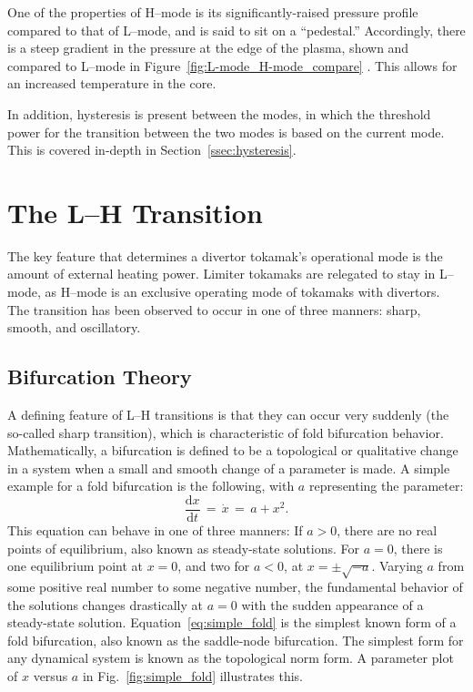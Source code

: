 One of the properties of H--mode is its significantly-raised pressure profile compared to that of L--mode, and is said to sit on a ``pedestal.''
Accordingly, there is a steep gradient in the pressure at the edge of the plasma, shown and compared to L--mode in Figure~\ref{fig:L-mode_H-mode_compare} \cite{weymiens_bifurcation_2014}.
This allows for an increased temperature in the core.

In addition, hysteresis is present between the modes, in which the threshold power for the transition between the two modes is based on the current mode.
This is covered in-depth in Section~\ref{ssec:hysteresis}.

\section{The L--H Transition}\label{sec:the_transition}
The key feature that determines a divertor tokamak's operational mode is the amount of external heating power.
Limiter tokamaks are relegated to stay in L--mode, as H--mode is an exclusive operating mode of tokamaks with divertors.
The transition has been observed to occur in one of three manners: sharp, smooth, and oscillatory.

\subsection{Bifurcation Theory}\label{ssec:bif_theory}
A defining feature of L--H transitions is that they can occur very suddenly (the so-called sharp transition), which is characteristic of fold bifurcation behavior.
Mathematically, a bifurcation is defined to be a topological or qualitative change in a system when a small and smooth change of a parameter is made.
A simple example for a fold bifurcation is the following, with $a$ representing the parameter:
\begin{equation} %
	\frac{\text{d}x}{\text{d}t} \,=\, \dot{x} \,=\, a + x^2.
	\label{eq:simple_fold}
\end{equation}
This equation can behave in one of three manners:
If $a > 0$, there are no real points of equilibrium, also known as steady-state solutions.
For $a = 0$, there is one equilibrium point at $x = 0$, and two for $a < 0$, at $x = \pm\sqrt{-a}$.
Varying $a$ from some positive real number to some negative number, the fundamental behavior of the solutions changes drastically at $a = 0$ with the sudden appearance of a steady-state solution.
Equation~\ref{eq:simple_fold} is the simplest known form of a fold bifurcation, also known as the saddle-node bifurcation.
The simplest form for any dynamical system is known as the topological norm form.
A parameter plot of $x$ versus $a$ in Fig.~\ref{fig:simple_fold} illustrates this.

